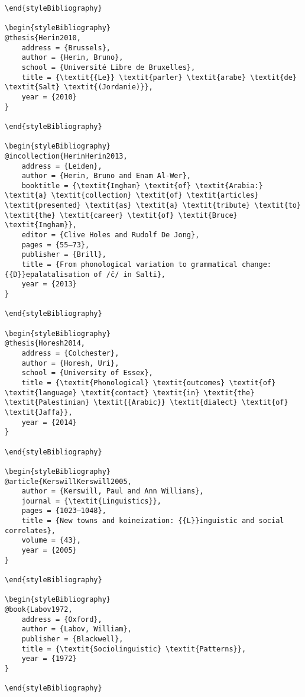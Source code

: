 \documentclass[output=paper]{langsci/langscibook}
\begin{document}
\begin{verbatim}
\end{styleBibliography}

\begin{styleBibliography}
@thesis{Herin2010,
	address = {Brussels},
	author = {Herin, Bruno},
	school = {Université Libre de Bruxelles},
	title = {\textit{{Le}} \textit{parler} \textit{arabe} \textit{de} \textit{Salt} \textit{(Jordanie)}},
	year = {2010}
}

\end{styleBibliography}

\begin{styleBibliography}
@incollection{HerinHerin2013,
	address = {Leiden},
	author = {Herin, Bruno and Enam Al-Wer},
	booktitle = {\textit{Ingham} \textit{of} \textit{Arabia:} \textit{a} \textit{collection} \textit{of} \textit{articles} \textit{presented} \textit{as} \textit{a} \textit{tribute} \textit{to} \textit{the} \textit{career} \textit{of} \textit{Bruce} \textit{Ingham}},
	editor = {Clive Holes and Rudolf De Jong},
	pages = {55–73},
	publisher = {Brill},
	title = {From phonological variation to grammatical change: {{D}}epalatalisation of /č/ in Salti},
	year = {2013}
}

\end{styleBibliography}

\begin{styleBibliography}
@thesis{Horesh2014,
	address = {Colchester},
	author = {Horesh, Uri},
	school = {University of Essex},
	title = {\textit{Phonological} \textit{outcomes} \textit{of} \textit{language} \textit{contact} \textit{in} \textit{the} \textit{Palestinian} \textit{{Arabic}} \textit{dialect} \textit{of} \textit{Jaffa}},
	year = {2014}
}

\end{styleBibliography}

\begin{styleBibliography}
@article{KerswillKerswill2005,
	author = {Kerswill, Paul and Ann Williams},
	journal = {\textit{Linguistics}},
	pages = {1023–1048},
	title = {New towns and koineization: {{L}}inguistic and social correlates},
	volume = {43},
	year = {2005}
}

\end{styleBibliography}

\begin{styleBibliography}
@book{Labov1972,
	address = {Oxford},
	author = {Labov, William},
	publisher = {Blackwell},
	title = {\textit{Sociolinguistic} \textit{Patterns}},
	year = {1972}
}

\end{styleBibliography}


\end{verbatim}
\end{document}
